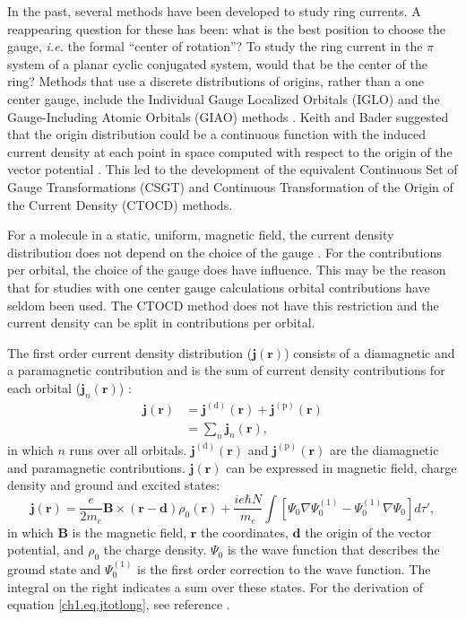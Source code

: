 In the past, several methods have been developed to study ring currents. A reappearing question for these has been: what is the best position to choose the gauge, \textit{i.e.} the formal ``center of rotation''? To study the ring current in the $\pi$ system of a planar cyclic conjugated system, would that be the center of the ring? Methods that use a discrete distributions of origins, rather than a one center gauge, include the Individual Gauge Localized Orbitals (IGLO) \cite{iglo1,iglo2} and the Gauge-Including Atomic Orbitals (GIAO) methods \cite{giao}. Keith and Bader suggested that the origin distribution could be a continuous function with the induced current density at each point in space computed with respect to the origin of the vector potential \cite{keithbader}. This led to the development of the equivalent Continuous Set of Gauge Transformations (CSGT) \cite{keithbader} and Continuous Transformation of the Origin of the Current Density (CTOCD) \cite{ctocd} methods.

For a molecule in a static, uniform, magnetic field, the current density distribution does not depend on the choice of the gauge \cite{ipso1}. For the contributions per orbital, the choice of the gauge does have influence. This may be the reason that for studies with one center gauge calculations orbital contributions have seldom been used. The CTOCD method does not have this restriction and the current density can be split in contributions per orbital.

The first order current density distribution ($\mathbf{j}(\mathbf{r})$) consists of a diamagnetic and a paramagnetic contribution and is the sum of current density contributions for each orbital ($\mathbf{j}_n(\mathbf{r})$) \cite{ipso1}:
\begin{equation}
\begin{split}
\mathbf{j}(\mathbf{r}) &= \mathbf{j}^{(\mathrm{d})}(\mathbf{r}) +\mathbf{j}^{(\mathrm{p})}(\mathbf{r}) \\
&= \sum_n \mathbf{j}_n(\mathbf{r}),
\label{ch1.eq.jtot}
\end{split}
\end{equation}
in which $n$ runs over all orbitals.  $\mathbf{j}^{(\mathrm{d})}(\mathbf{r})$ and $\mathbf{j}^{(\mathrm{p})}(\mathbf{r})$ are the diamagnetic and paramagnetic contributions. $\mathbf{j}(\mathbf{r})$ can be expressed in magnetic field, charge density and ground and excited states:
\begin{equation}
\mathbf{j}(\mathbf{r}) = \frac{e}{2m_e} \mathbf{B} \times (\mathbf{r}-\mathbf{d}) \rho_0 (\mathbf{r}) + \frac{ie{\hbar}N}{m_e} \int [ \Psi_0 \nabla \Psi^{(1)}_0 - \Psi^{(1)}_0 \nabla \Psi_0 ] d\tau',
\label{ch1.eq.jtotlong}
\end{equation}
in which $\mathbf{B}$ is the magnetic field, $\mathbf{r}$ the coordinates, $\mathbf{d}$ the origin of the vector potential, and $\rho_0$ the charge density. $\Psi_0$ is the wave function that describes the ground state and $\Psi^{(1)}_0$ is the first order correction to the wave function. The integral on the right indicates a sum over these states. For the derivation of equation \ref{ch1.eq.jtotlong}, see reference \cite{ipso1}.

